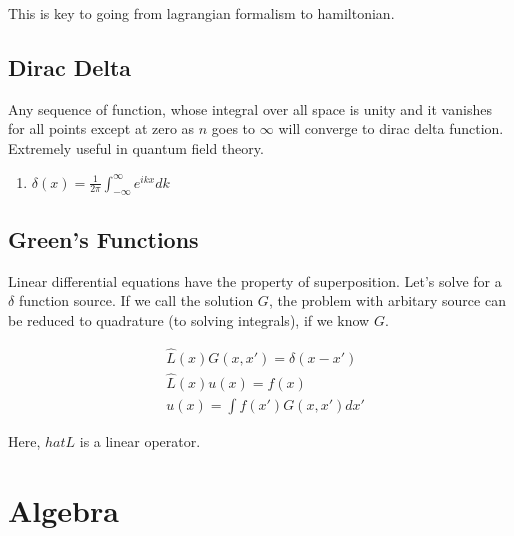 \documentclass{report}
\begin{document}
\noindent This is key to going from lagrangian formalism to hamiltonian.

\section{Dirac Delta}
Any sequence of function, whose integral over all space is unity and it vanishes for all points except at zero as $n$ goes to $\infty$ will converge to dirac delta function. Extremely useful in quantum field theory.

\begin{enumerate}
  \item $\delta(x) = \frac{1}{2\pi}\int_{-\infty}^{\infty} e^{ikx} dk $
\end{enumerate}

\section{Green's Functions}

Linear differential equations have the property of superposition. Let's solve for a $\delta$ function source. If we call the solution $G$, the problem with arbitary source can be reduced to quadrature (to solving integrals), if we know $G$.

\begin{align}
  &\hat{L}(x)G(x,x') = \delta(x-x')\\
  &\hat{L}(x)u(x) = f(x)\\\nonumber
  &u(x) = \int{f(x')G(x,x')}dx'
\end{align}

Here, $hat{L}$ is a linear operator.

\chapter{Algebra}
\end{document}

